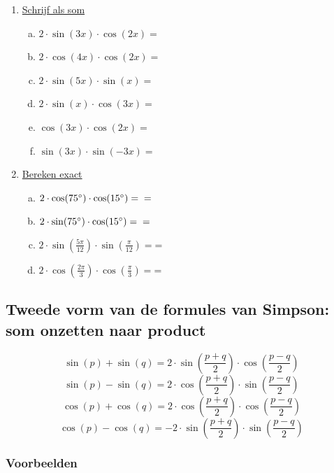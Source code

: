 \documentclass[a4paper,12pt]{article}
\begin{document}
\begin{enumerate}[(1)]
  \item\underline{Schrijf als som}
    \begin{enumerate}[(a)]
      \item $2\cdot \sin(3x)\cdot \cos(2x)= $\dotfill
      \item $2\cdot \cos(4x)\cdot \cos(2x)= $\dotfill
      \item $2\cdot \sin(5x)\cdot \sin(x)= $\dotfill
      \item $2\cdot \sin(x)\cdot \cos(3x)= $\dotfill
      \item $\cos(3x)\cdot \cos(2x)= $\dotfill
      \item $\sin(3x)\cdot \sin(-3x)= $\dotfill
    \end{enumerate}
  \item \underline{Bereken exact}
    \begin{enumerate}[(a)]
      \item $2\cdot \cos(75\degree)\cdot \cos(15\degree) = \dotfill \newline =$\dotfill
      \item $2\cdot \sin(75\degree)\cdot \cos(15\degree) = \dotfill \newline =$\dotfill
      \item $2\cdot \sin(\frac{5\pi}{12})\cdot \sin(\frac{\pi}{12}) = $\dotfill \newline =\dotfill
      \item $2\cdot \cos(\frac{2\pi}{3})\cdot \cos(\frac{\pi}{3}) = $\dotfill \newline =\dotfill
    \end{enumerate}
\end{enumerate}

\newpage
\subsection{Tweede vorm van de formules van Simpson: som onzetten naar product}
\[\sin(p)+\sin(q)=2\cdot \sin(\frac{p+q}{2})\cdot \cos(\frac{p-q}{2})
\]
\[\sin(p)-\sin(q)=2\cdot \cos(\frac{p+q}{2})\cdot \sin(\frac{p-q}{2})
\]
\[\cos(p)+\cos(q)=2\cdot \cos(\frac{p+q}{2})\cdot \cos(\frac{p-q}{2})
\]
\[\cos(p)-\cos(q)=-2\cdot \sin(\frac{p+q}{2})\cdot \sin(\frac{p-q}{2})
\]

\subsubsection{Voorbeelden}
\end{document}
